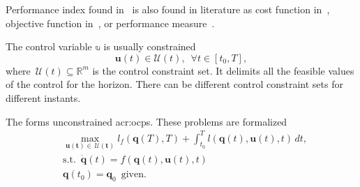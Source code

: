 Performance index found in~\citep{bryson1975applied} is also found in literature as cost function in~\citep{simon2006optimal,stengel1994optimal}, objective function in~\citep{rao2019engineering,sethi2019optimal,rawlings2017model}, or performance measure~\citep{kirk2004optimal}.

The control variable $\mathbb{u}$ is usually constrained
\begin{equation}\label{eq:optimization:control-constraint-set}
    \mathbf{u}(t)\in\mathcal{U}(t),\,\,\,\forall t\in[t_0,T],
\end{equation}
where $\,\mathcal{U}(t)\subseteq \mathbb{R}^m$ is the control constraint set. It delimits all the feasible values of the control for the horizon. There can be different control constraint sets for different instants.

The  forms unconstrained \Gls{acr:ocp}s. These problems are formalized
\begin{equation}\label{eq:optimization:unconstrained-opt-control-pb}\begin{split}
    &\max_{\mathbf{u(t)\in\,\mathcal{U}(t)}}{l_f(\mathbf{q}(T),T)+\int_{t_0}^{T}{l(\mathbf{q}(t),\mathbf{u}(t),t)\,dt}},\\
    &\text{s.t.}\,\,\,\dot{\mathbf{q}}(t)=f(\mathbf{q}(t),\mathbf{u}(t),t)\\
    &\mathbf{q}(t_0)=\mathbf{q}_0\,\,\,\text{given}.
\end{split}\end{equation}

